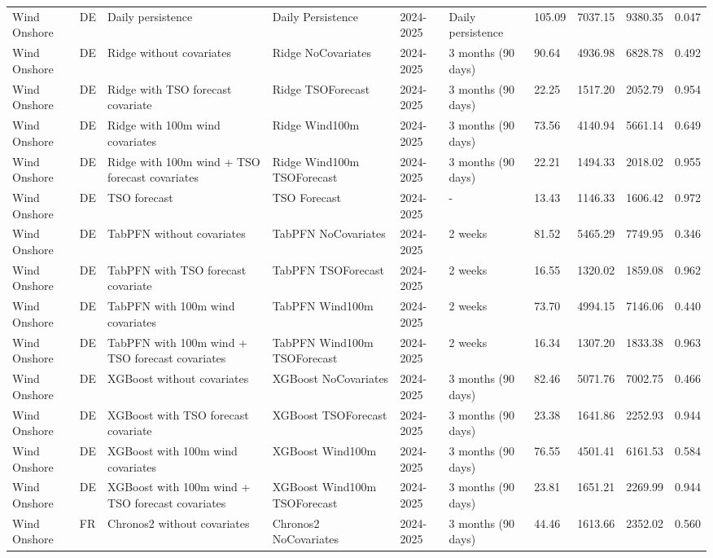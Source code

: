 \begin{longtable}{llllllllll}
Wind Onshore & DE & Daily persistence & Daily Persistence & 2024-2025 & Daily persistence & 105.09 & 7037.15 & 9380.35 & 0.047 \\
Wind Onshore & DE & Ridge without covariates & Ridge NoCovariates & 2024-2025 & 3 months (90 days) & 90.64 & 4936.98 & 6828.78 & 0.492 \\
Wind Onshore & DE & Ridge with TSO forecast covariate & Ridge TSOForecast & 2024-2025 & 3 months (90 days) & 22.25 & 1517.20 & 2052.79 & 0.954 \\
Wind Onshore & DE & Ridge with 100m wind covariates & Ridge Wind100m & 2024-2025 & 3 months (90 days) & 73.56 & 4140.94 & 5661.14 & 0.649 \\
Wind Onshore & DE & Ridge with 100m wind + TSO forecast covariates & Ridge Wind100m TSOForecast & 2024-2025 & 3 months (90 days) & 22.21 & 1494.33 & 2018.02 & 0.955 \\
Wind Onshore & DE & TSO forecast & TSO Forecast & 2024-2025 & - & 13.43 & 1146.33 & 1606.42 & 0.972 \\
Wind Onshore & DE & TabPFN without covariates & TabPFN NoCovariates & 2024-2025 & 2 weeks & 81.52 & 5465.29 & 7749.95 & 0.346 \\
Wind Onshore & DE & TabPFN with TSO forecast covariate & TabPFN TSOForecast & 2024-2025 & 2 weeks & 16.55 & 1320.02 & 1859.08 & 0.962 \\
Wind Onshore & DE & TabPFN with 100m wind covariates & TabPFN Wind100m & 2024-2025 & 2 weeks & 73.70 & 4994.15 & 7146.06 & 0.440 \\
Wind Onshore & DE & TabPFN with 100m wind + TSO forecast covariates & TabPFN Wind100m TSOForecast & 2024-2025 & 2 weeks & 16.34 & 1307.20 & 1833.38 & 0.963 \\
Wind Onshore & DE & XGBoost without covariates & XGBoost NoCovariates & 2024-2025 & 3 months (90 days) & 82.46 & 5071.76 & 7002.75 & 0.466 \\
Wind Onshore & DE & XGBoost with TSO forecast covariate & XGBoost TSOForecast & 2024-2025 & 3 months (90 days) & 23.38 & 1641.86 & 2252.93 & 0.944 \\
Wind Onshore & DE & XGBoost with 100m wind covariates & XGBoost Wind100m & 2024-2025 & 3 months (90 days) & 76.55 & 4501.41 & 6161.53 & 0.584 \\
Wind Onshore & DE & XGBoost with 100m wind + TSO forecast covariates & XGBoost Wind100m TSOForecast & 2024-2025 & 3 months (90 days) & 23.81 & 1651.21 & 2269.99 & 0.944 \\
Wind Onshore & FR & Chronos2 without covariates & Chronos2 NoCovariates & 2024-2025 & 3 months (90 days) & 44.46 & 1613.66 & 2352.02 & 0.560 \\

\end{longtable}
